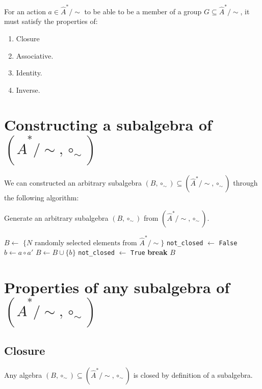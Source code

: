 For an action $a \in \hat{A}^{*}/\sim$ to be able to be a member of a group $G \subseteq \hat{A}^{*}/\sim$, it must satisfy the properties of:
\begin{enumerate}
    \item Closure
    \item Associative.
    \item Identity.
    \item Inverse.
\end{enumerate}

\section{Constructing a subalgebra \texorpdfstring{of $(\hat{A}^{*}/\sim, \circ_{\sim})$}{}}

We can constructed an arbitrary subalgebra $(B, \circ_{\sim}) \subseteq (\hat{A}^{*}/\sim, \circ_{\sim})$ through the following algorithm:
\begin{algorithm}[H]
\caption{
Generate an arbitrary subalgebra $(B, \circ_{\sim})$ from $(\hat{A}^{*}/\sim, \circ_{\sim})$.
}
\hrulefill
\begin{algorithmic}[1]
\State $B \gets$ $\{ N \text{ randomly selected elements from } \hat{A}^{*}/\sim \}$
    \State \texttt{not\_closed} $\gets$ \texttt{False}
        \State $b \gets a \circ a'$
            \State $B \gets B \cup \{b\}$
            \State \texttt{not\_closed} $\gets$ \texttt{True}
        \EndIf
    \EndFor
        \State \textbf{break}
    \EndIf
\EndWhile
\State \Return $B$
\EndProcedure
\end{algorithmic}
\end{algorithm}

\section{Properties of any subalgebra \texorpdfstring{of $(\hat{A}^{*}/\sim, \circ_{\sim})$}{}}

\subsection{Closure}
Any algebra $(B, \circ_{\sim}) \subseteq (\hat{A}^{*}/\sim, \circ_{\sim})$ is closed by definition of a subalgebra.

